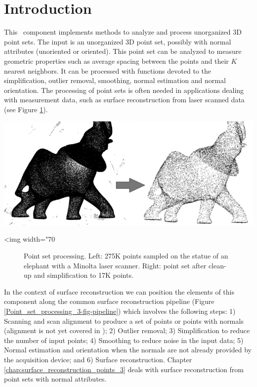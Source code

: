 \section{Introduction}

This \cgal\ component implements methods to analyze and process unorganized 3D point sets. The input is an unorganized 3D point set, possibly with normal attributes (unoriented or oriented). This point set can be analyzed to measure geometric properties such as average spacing between the points and their $K$ nearest neighbors. It can be processed with functions devoted to the simplification, outlier removal, smoothing, normal estimation and normal orientation. The processing of point sets is often needed in applications dealing with measurement data, such as surface reconstruction from laser scanned data (see Figure \ref{Point_set_processing_3-fig-introduction}).

\begin{center}
    \begin{ccTexOnly}
        \includegraphics[width=1.0\textwidth]{Point_set_processing_3/introduction} %
    \end{ccTexOnly}
    \begin{ccHtmlOnly}
        <img width="70%
    \end{ccHtmlOnly}
    \begin{figure}[h]
        \caption{Point set processing.
                 Left: 275K points sampled on the statue of
                 an elephant with a Minolta laser scanner.
                 Right: point set after clean-up and
                 simplification to 17K points.}
        \label{Point_set_processing_3-fig-introduction}
    \end{figure}
\end{center}

In the context of surface reconstruction we can position the elements of this component along the common surface reconstruction pipeline (Figure \ref{Point_set_processing_3-fig-pipeline}) which involves the following steps: 1) Scanning and scan alignment to produce a set of points or points with normals (alignment is not yet covered in \cgal); 2) Outlier removal; 3) Simplification to reduce the number of input points; 4) Smoothing to reduce noise in the input data; 5) Normal estimation and orientation when the normals are not already provided by the acquisition device; and 6) Surface reconstruction. Chapter  \ref{chap:surface_reconstruction_points_3} deals with surface reconstruction from point sets with normal attributes.

